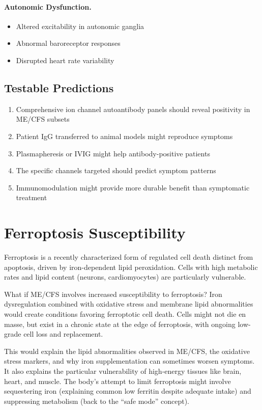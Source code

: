 \paragraph{Autonomic Dysfunction.}
\begin{itemize}
    \item Altered excitability in autonomic ganglia
    \item Abnormal baroreceptor responses
    \item Disrupted heart rate variability
\end{itemize}

\subsection{Testable Predictions}

\begin{enumerate}
    \item Comprehensive ion channel autoantibody panels should reveal positivity in ME/CFS subsets
    \item Patient IgG transferred to animal models might reproduce symptoms
    \item Plasmapheresis or IVIG might help antibody-positive patients
    \item The specific channels targeted should predict symptom patterns
    \item Immunomodulation might provide more durable benefit than symptomatic treatment
\end{enumerate}


\section{Ferroptosis Susceptibility}
\label{sec:ferroptosis}

\begin{open_question}
Ferroptosis is a recently characterized form of regulated cell death distinct from apoptosis, driven by iron-dependent lipid peroxidation. Cells with high metabolic rates and lipid content (neurons, cardiomyocytes) are particularly vulnerable.

What if ME/CFS involves increased susceptibility to ferroptosis? Iron dysregulation combined with oxidative stress and membrane lipid abnormalities would create conditions favoring ferroptotic cell death. Cells might not die en masse, but exist in a chronic state at the edge of ferroptosis, with ongoing low-grade cell loss and replacement.

This would explain the lipid abnormalities observed in ME/CFS, the oxidative stress markers, and why iron supplementation can sometimes worsen symptoms. It also explains the particular vulnerability of high-energy tissues like brain, heart, and muscle. The body's attempt to limit ferroptosis might involve sequestering iron (explaining common low ferritin despite adequate intake) and suppressing metabolism (back to the ``safe mode'' concept).
\end{open_question}

